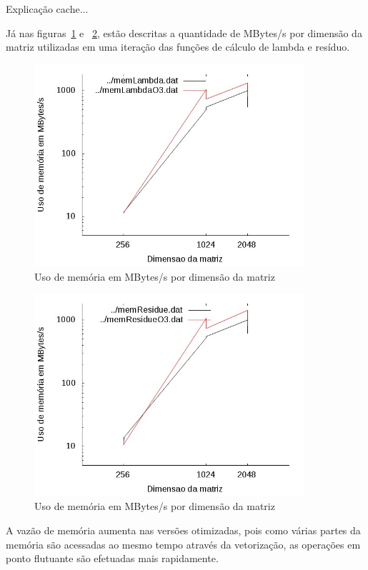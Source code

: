 \documentclass[12pt]{article}
\begin{document}
Explicação cache... %

\clearpage

Já nas figuras~\ref{fig:memLambda} e ~\ref{fig:memResidue}, estão descritas
a quantidade de MBytes/s por dimensão da matriz utilizadas em uma iteração das
funções de cálculo de lambda e resíduo.

\begin{figure}[htb] \begin{center}
\includegraphics[width=100mm]{img/memLambda.jpg} \end{center}
\caption{Uso de memória em MBytes/s por dimensão da matriz}\label{fig:memLambda}
\end{figure}

\begin{figure}[htb] \begin{center}
\includegraphics[width=100mm]{img/memResidue.jpg} \end{center}
\caption{Uso de memória em MBytes/s por dimensão da matriz}\label{fig:memResidue}
\end{figure}

A vazão de memória aumenta nas versões otimizadas, pois como várias partes da
memória são acessadas ao mesmo tempo através da vetorização, as operações em
ponto flutuante são efetuadas mais rapidamente.
\end{document}

